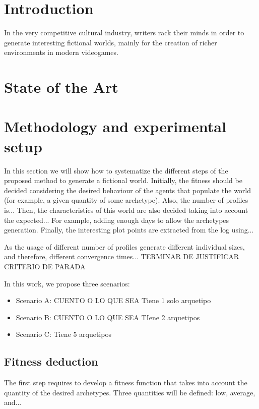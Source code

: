 \documentclass[runningheads,a4paper]{llncs}
\begin{document}
\section{Introduction}

In the very competitive cultural industry, writers rack their minds in
order to generate interesting fictional worlds, mainly for the
creation of richer environments in modern videogames.  

\section{State of the Art}


\section{Methodology and experimental setup} %
\label{sec:met}

In this section we will show how to systematize the different steps of the proposed method to generate a fictional world. Initially, the fitness should be decided considering the desired behaviour of the agents that populate the world (for example, a given quantity of some archetype). Also, the number of profiles is...  Then, the characteristics of this world are also decided taking into account the expected... For example, adding enough days to allow the archetypes generation. Finally, the interesting plot points are extracted from the log using... 

As the usage of different number of profiles generate different individual sizes, and therefore, different convergence times... TERMINAR DE JUSTIFICAR CRITERIO DE PARADA

In this work, we propose three scenarios:
\begin{itemize}
\item Scenario A: CUENTO O LO QUE SEA Tiene 1 solo arquetipo
\item Scenario B: CUENTO O LO QUE SEA TIene 2 arquetipos
\item Scenario C: Tiene 5 arquetipos
\end{itemize}

\subsection{Fitness deduction}

The first step requires to develop a fitness function that takes into account the quantity of the desired archetypes. Three quantities will be defined: low, average, and...
\end{document}
